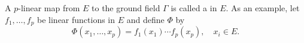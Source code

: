 A $p$-linear map from $E$ to the ground field $\Gamma$ is called a  in $E$.
As an example, let $f_1, \ldots, f_p$ be linear functions in $E$ and define $\Phi$ by
$$\Phi(x_1, \ldots, x_p) = f_1(x_1) \cdots f_p(x_p), \quad x_i \in E.$$
